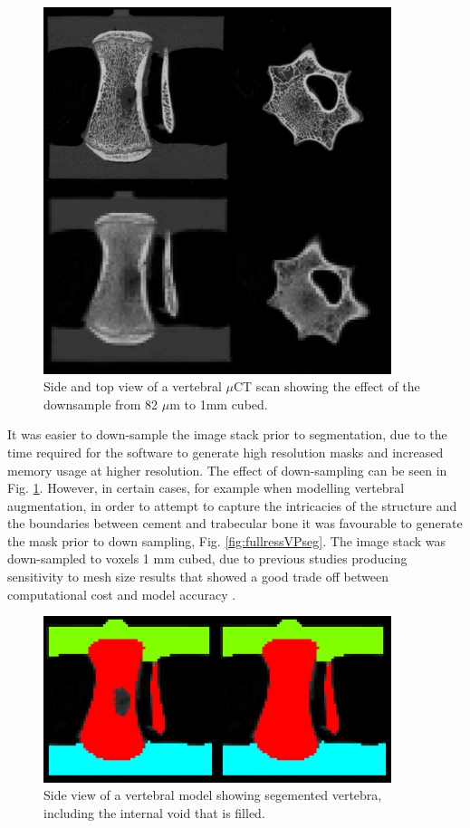 \begin{figure}[ht!]
\centering
  \includegraphics[width=4in]{images/compofDownsample.png}
  \caption{Side and top view of a vertebral $\mu$CT scan showing the effect of the downsample from 82 $\mu$m to 1mm cubed.}
\label{fig:compofDownsample}
\end{figure}




It was easier to down-sample the image stack prior to
segmentation, due to the time required for the software to generate
high resolution masks and increased memory usage at higher resolution. The effect of down-sampling can be seen in Fig. \ref{fig:compofDownsample}. However, in certain cases, for example when
modelling vertebral augmentation, in order to attempt to capture the
intricacies of the structure and the boundaries between cement and
trabecular bone it was favourable to generate the mask prior to down
sampling, Fig. \ref{fig:fullressVPseg}. The image stack was down-sampled to voxels 1 mm cubed, due to
previous studies producing sensitivity to mesh size results that showed
a good trade off between computational cost and model accuracy \cite{Jones2007}.



\begin{figure}[ht!]
\centering
  \includegraphics[width=4in]{images/fillTheVoid.png}
  \caption{Side view of a vertebral model showing segemented vertebra, including the internal void that is filled.}
\label{fig:fillTheVoid}
\end{figure}


